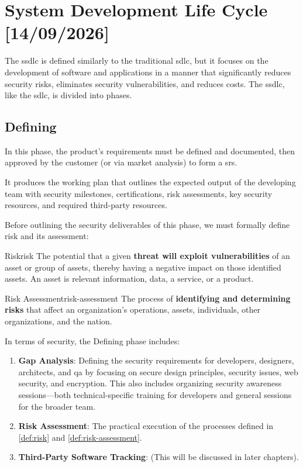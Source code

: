 \chapter{System Development Life Cycle [14/09/2026]}
The \gls{ssdlc} is defined similarly to the traditional \gls{sdlc}, but it focuses on the development of software and applications in a manner that significantly reduces security risks, eliminates security vulnerabilities, and reduces costs. The \gls{ssdlc}, like the \gls{sdlc}, is divided into phases. 

\section{Defining}
In this phase, the product's requirements must be defined and documented, then approved by the customer (or via market analysis) to form a \gls{srs}. 

It produces the working plan that outlines the expected output of the developing team with security milestones, certifications, risk assessments, key security resources, and required third-party resources.

Before outlining the security deliverables of this phase, we must formally define risk and its assessment:

\begin{definition}{Risk}{risk}
    The potential that a given \textbf{threat will exploit vulnerabilities} of an asset or group of assets, thereby having a negative impact on those identified assets. An asset is relevant information, data, a service, or a product.
\end{definition}

\begin{definition}{Risk Assessment}{risk-assessment}
    The process of \textbf{identifying and determining risks} that affect an organization's operations, assets, individuals, other organizations, and the nation.
\end{definition}

\noindent In terms of security, the Defining phase includes:
\begin{enumerate}
    \item \textbf{Gap Analysis}: Defining the security requirements for developers, designers, architects, and \gls{qa} by focusing on secure design principles, security issues, web security, and encryption. This also includes organizing security awareness sessions—both technical-specific training for developers and general sessions for the broader team.
    \item \textbf{Risk Assessment}: The practical execution of the processes defined in \cref{def:risk} and \cref{def:risk-assessment}.
    \item \textbf{Third-Party Software Tracking}: (This will be discussed in later chapters).
\end{enumerate}

